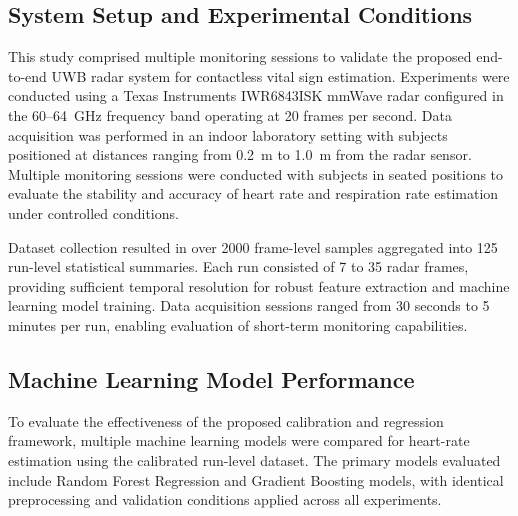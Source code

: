 \documentclass[conference]{IEEEtran}
\begin{document}
\subsection{System Setup and Experimental Conditions}

This study comprised multiple monitoring sessions to validate the proposed end-to-end UWB radar system for contactless vital sign estimation. Experiments were conducted using a Texas Instruments IWR6843ISK mmWave radar configured in the 60--64~GHz frequency band operating at 20 frames per second. Data acquisition was performed in an indoor laboratory setting with subjects positioned at distances ranging from 0.2~m to 1.0~m from the radar sensor. Multiple monitoring sessions were conducted with subjects in seated positions to evaluate the stability and accuracy of heart rate and respiration rate estimation under controlled conditions.

Dataset collection resulted in over 2000 frame-level samples aggregated into 125 run-level statistical summaries. Each run consisted of 7 to 35 radar frames, providing sufficient temporal resolution for robust feature extraction and machine learning model training. Data acquisition sessions ranged from 30 seconds to 5 minutes per run, enabling evaluation of short-term monitoring capabilities.

\subsection{Machine Learning Model Performance}

To evaluate the effectiveness of the proposed calibration and regression framework, multiple machine learning models were compared for heart-rate estimation using the calibrated run-level dataset. The primary models evaluated include Random Forest Regression and Gradient Boosting models, with identical preprocessing and validation conditions applied across all experiments.

\begin{table}[t]
\centering
\caption{Performance Metrics for Calibration Models}
\label{tab:calibration_performance}
\renewcommand{\arraystretch}{1.2}

\end{table}
\end{document}
